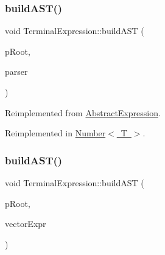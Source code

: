 \subsubsection{\texorpdfstring{buildAST()}{buildAST()}\hspace{0.1cm}{\footnotesize\ttfamily [1/2]}}
{\footnotesize\ttfamily void Terminal\+Expression\+::build\+A\+ST (\begin{DoxyParamCaption}\item[{std\+::unique\+\_\+ptr$<$ \mbox{\hyperlink{class_abstract_expression}{Abstract\+Expression}} $>$ \&}]{p\+Root,  }\item[{\mbox{\hyperlink{class_parser}{Parser}} \&}]{parser }\end{DoxyParamCaption})\hspace{0.3cm}{\ttfamily [virtual]}}



Reimplemented from \mbox{\hyperlink{class_abstract_expression_a22801ba2c981103d20c8af71625a0b39}{Abstract\+Expression}}.



Reimplemented in \mbox{\hyperlink{class_number_af80f6bc48cbe13fb075447a0b8eca5f9}{Number$<$ T $>$}}.

\mbox{\label{class_terminal_expression_a5ac1e0df8fe690e3ca5572d7a8f89662}} 
\subsubsection{\texorpdfstring{buildAST()}{buildAST()}\hspace{0.1cm}{\footnotesize\ttfamily [2/2]}}
{\footnotesize\ttfamily void Terminal\+Expression\+::build\+A\+ST (\begin{DoxyParamCaption}\item[{std\+::unique\+\_\+ptr$<$ \mbox{\hyperlink{class_abstract_expression}{Abstract\+Expression}} $>$ \&}]{p\+Root,  }\item[{std\+::vector$<$ std\+::unique\+\_\+ptr$<$ \mbox{\hyperlink{class_abstract_expression}{Abstract\+Expression}} $>$$>$ \&}]{vector\+Expr }\end{DoxyParamCaption})}

\mbox{\label{class_terminal_expression_ac638c0ed2eeb96a2ac41ca5c0e193061}} 
